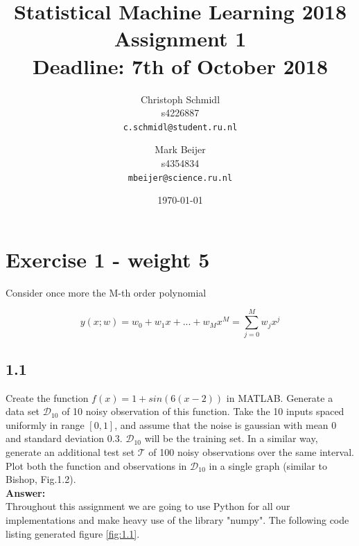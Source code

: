 \documentclass[a4paper]{article}
\title{Statistical Machine Learning 2018\\Assignment 1\\Deadline: 7th of October 2018}
\author{
  Christoph Schmidl\\ s4226887\\      \texttt{c.schmidl@student.ru.nl}
  \and
  Mark Beijer\\ s4354834\\     \texttt{mbeijer@science.ru.nl}
}
\date{\today}
\begin{document}
\maketitle


\section*{Exercise 1 - weight 5}

Consider once more the M-th order polynomial

\begin{equation}
	y(x;w) = w_0 + w_1x + ... + w_Mx^M = \sum_{j = 0}^M w_jx^j
\end{equation}

\subsection*{1.1}

Create the function $f(x) = 1 + sin(6(x-2))$ in MATLAB. Generate a data set $\mathcal{D}_{10}$ of 10 noisy observation of this function. Take the 10 inputs spaced uniformly in range $[0,1]$, and assume that the noise is gaussian with mean 0 and standard deviation 0.3. $\mathcal{D}_{10}$ will be the training set. In a similar way, generate an additional test set $\mathcal{T}$ of 100 noisy observations over the same interval. Plot both the function and observations in $\mathcal{D}_{10}$ in a single graph (similar to Bishop, Fig.1.2).\\

\textbf{Answer:}\\

Throughout this assignment we are going to use Python for all our implementations and make heavy use of the library "numpy". The following code listing generated figure \ref{fig:1.1}.
\end{document}
